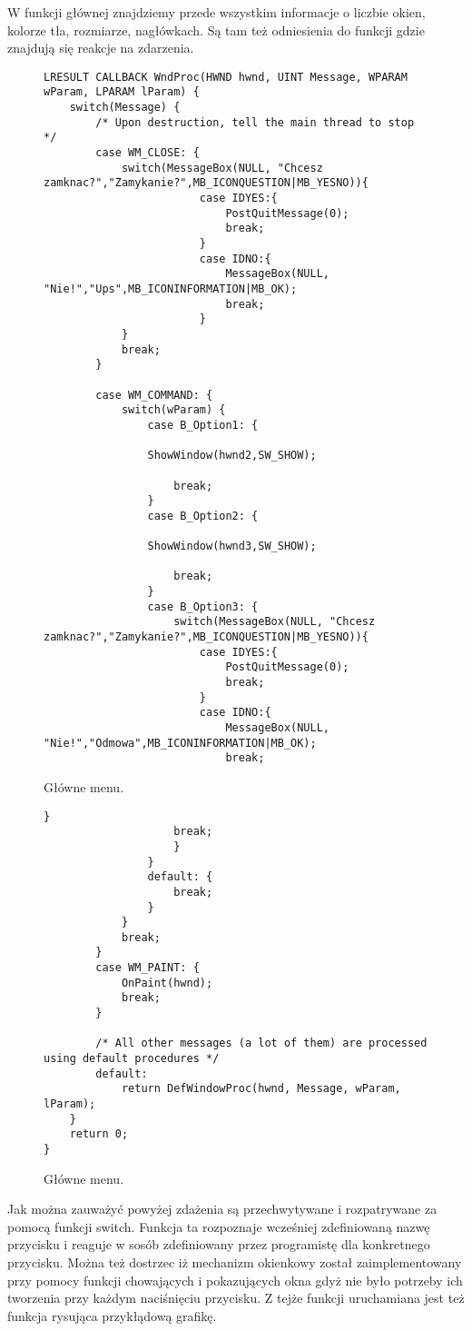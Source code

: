 \documentclass[a4paper,twoside,12pt]{mgr}
\begin{document}
W funkcji głównej znajdziemy przede wszystkim informacje o liczbie okien, kolorze tła, rozmiarze, nagłówkach. Są tam też odniesienia do funkcji gdzie znajdują się reakcje na zdarzenia.

\begin{figure}[H]
\centering
\begin{lstlisting}[frame=single]	
LRESULT CALLBACK WndProc(HWND hwnd, UINT Message, WPARAM wParam, LPARAM lParam) {
	switch(Message) {
		/* Upon destruction, tell the main thread to stop */
		case WM_CLOSE: {
			switch(MessageBox(NULL, "Chcesz zamknac?","Zamykanie?",MB_ICONQUESTION|MB_YESNO)){
						case IDYES:{
							PostQuitMessage(0);
							break;
						}
						case IDNO:{
							MessageBox(NULL, "Nie!","Ups",MB_ICONINFORMATION|MB_OK);
							break;
						}
			}
			break;
		}
		
		case WM_COMMAND: {
			switch(wParam) {
				case B_Option1: {
				
				ShowWindow(hwnd2,SW_SHOW);	
					
					break;
				}
				case B_Option2: {
					
				ShowWindow(hwnd3,SW_SHOW);	
				
					break;	
				}
				case B_Option3: {
					switch(MessageBox(NULL, "Chcesz zamknac?","Zamykanie?",MB_ICONQUESTION|MB_YESNO)){
						case IDYES:{
							PostQuitMessage(0);
							break;
						}
						case IDNO:{
							MessageBox(NULL, "Nie!","Odmowa",MB_ICONINFORMATION|MB_OK);
							break;
\end{lstlisting}
\caption{Główne menu.}%
\label{rys:etykieta}
\end{figure}	

\begin{figure}[H]
\centering
\begin{lstlisting}[frame=single]	
												}
					break;
					}
				}
				default: {
					break;
				}
			}
			break;
		}
		case WM_PAINT: {
			OnPaint(hwnd);
			break;
		}
		
		/* All other messages (a lot of them) are processed using default procedures */
		default:
			return DefWindowProc(hwnd, Message, wParam, lParam);
	}
	return 0;
}
\end{lstlisting}
\caption{Główne menu.}%
\label{rys:etykieta}
\end{figure}

Jak można zauważyć powyżej zdażenia są przechwytywane i rozpatrywane za pomocą funkcji switch. Funkcja ta rozpoznaje wcześniej zdefiniowaną nazwę przycisku i reaguje w sosób zdefiniowany przez programistę dla konkretnego przycisku. Można też dostrzec iż mechanizm okienkowy został zaimplementowany przy pomocy funkcji chowających i pokazujących okna gdyż nie było potrzeby ich tworzenia przy każdym naciśnięciu przycisku. Z tejże funkcji uruchamiana jest też funkcja rysująca przykłądową grafikę.
\end{document}
